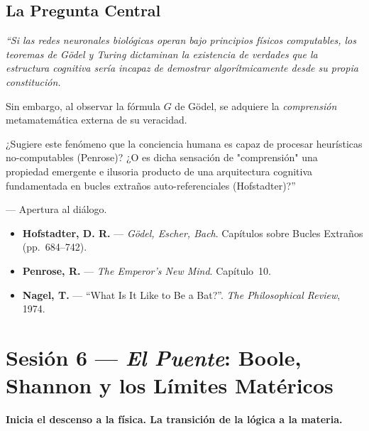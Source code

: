 \documentclass[11pt, letterpaper]{article}
\begin{document}
\subsection*{La Pregunta Central}
\begin{tcolorbox}[colback=outdoorgreen!5, colframe=outdoorgreen, boxrule=0.7pt, left=8pt, right=8pt, top=6pt, bottom=6pt]
{\itshape ``Si las redes neuronales biol\'ogicas operan bajo principios f\'isicos computables, los teoremas de G\"odel y Turing dictaminan la existencia de verdades que la estructura cognitiva ser\'ia incapaz de demostrar algor\'itmicamente desde su propia constituci\'on.

Sin embargo, al observar la f\'ormula $G$ de G\"odel, se adquiere la \emph{comprensi\'on} metamatem\'atica externa de su veracidad.

¿Sugiere este fen\'omeno que la conciencia humana es capaz de procesar heur\'isticas no-computables (Penrose)? ¿O es dicha sensaci\'on de "comprensi\'on" una propiedad emergente e ilusoria producto de una arquitectura cognitiva fundamentada en bucles extra\~nos auto-referenciales (Hofstadter)?''}

\medskip
\hfill --- Apertura al di\'alogo.
\end{tcolorbox}

\begin{lecturas}
\begin{itemize}
  \item[$(\star)$] \textbf{Hofstadter, D. R.} --- \emph{G\"odel, Escher, Bach}. Cap\'itulos sobre Bucles Extra\~nos (pp.\ 684--742).
  \item \textbf{Penrose, R.} --- \emph{The Emperor's New Mind}. Cap\'itulo~10.
  \item \textbf{Nagel, T.} --- ``What Is It Like to Be a Bat?''. \textit{The Philosophical Review}, 1974.
\end{itemize}
\end{lecturas}

\newpage

\section{Sesi\'on 6 --- \textit{El Puente}: Boole, Shannon y los L\'imites Mat\'ericos}

\textcolor{mitred}{\textbf{Inicia el descenso a la f\'isica. La transici\'on de la l\'ogica a la materia.}}
\end{document}

